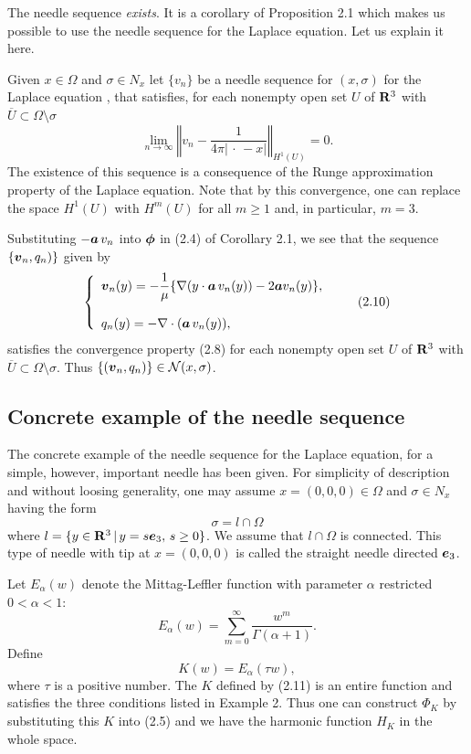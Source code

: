 The needle sequence {\it exists}.  It is a corollary of Proposition 2.1 which makes us possible to use the needle sequence for the Laplace equation.  
Let us explain it here.


Given $x\in\Omega$ and $\sigma\in N_x$
let $\{v_n\}$ be a needle sequence for $(x,\sigma)$ for the Laplace equation \cite{INew}, that satisfies,
for each nonempty open set $U$ of  $\Bbb R^3$ with $\overline{U}\subset\Omega\setminus\sigma$
$$\displaystyle
\lim_{n\rightarrow\infty}\left\Vert v_n-\frac{1}{4\pi\vert \,\cdot\,-x\vert}\right\Vert_{H^1(U)}=0.
$$
The existence of this sequence is a consequence of the Runge approximation property of the Laplace equation.
Note that by this convergence, one can replace the space $H^1(U)$ with $H^m(U)$ for all $m\ge 1$ and, in particular,
$m=3$.  

Substituting $-\mbox{\boldmath $a$}\,v_n$ into $\mbox{\boldmath $\phi$}$ in (2.4) of Corollary 2.1,
we see that the sequence $\{\mbox{\boldmath $v$}_n,q_n)\}$
given by
$$\left\{\begin{array}{l}
\displaystyle
\mbox{\boldmath $v$}_n(y)
=-\frac{1}{\mu}\{\nabla(y\cdot\mbox{\boldmath $a$}\,v_n(y))-2\mbox{\boldmath $a$}v_n(y)\},
\\
\\
\displaystyle
q_n(y)=-\nabla\cdot(\mbox{\boldmath $a$}\,v_n(y)),
\end{array}
\right.
\tag {2.10}
$$
satisfies the convergence property (2.8) for each nonempty open set $U$
of $\Bbb R^3$ with $\overline{U}\subset\Omega\setminus\sigma$.
Thus $\{(\mbox{\boldmath $v$}_n, q_n)\}\in{\cal N}(x,\sigma)$.



\subsection{Concrete example of the needle sequence}


The concrete example of the needle sequence for the Laplace equation,
for a simple, however, important needle has been given.
For simplicity of description and without loosing generality, one may assume $x=(0,0,0)\in\Omega$ and
 $\sigma\in N_x$ having the form
 $$\displaystyle
 \sigma=l\cap\Omega
 $$
 where $l=\{y\in\Bbb R^3\,\vert\,y=s\mbox{\boldmath $e$}_3,\, s\ge 0\}$.
 We assume that $l\cap\Omega$ is connected.  This type of needle with tip at $x=(0,0,0)$ is called the straight needle
 directed $\mbox{\boldmath $e$}_3$.
 
 Let $E_{\alpha}(w)$ denote the Mittag-Leffler function with parameter $\alpha$ restricted $0<\alpha<1$:
 $$\displaystyle
 E_{\alpha}(w)=\sum_{m=0}^{\infty}\frac{w^m}{\Gamma(\alpha+1)}.
 $$
 Define
 $$\displaystyle
 K(w)=E_{\alpha}(\tau w),
 \tag {2.11}
 $$
 where $\tau$ is a positive number.  
 The $K$ defined by (2.11) is an entire function and satisfies the three conditions listed in Example 2.
 Thus one can construct $\Phi_K$ by substituting this $K$ into (2.5) and we have
 the harmonic function $H_K$ in the whole space.  
 
